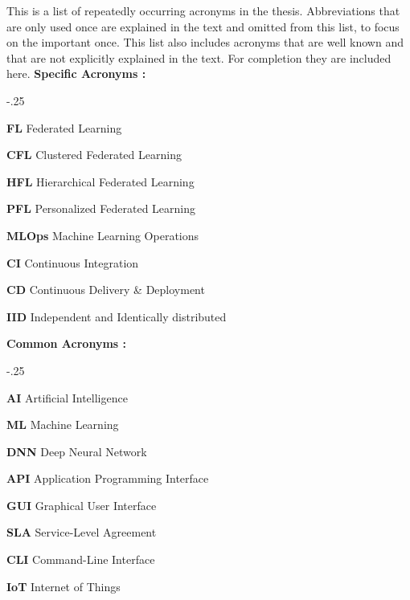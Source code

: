 This is a list of repeatedly occurring acronyms in the thesis.
Abbreviations that are only used once are explained in the text and omitted from this list,
to focus on the important once.
This list also includes acronyms that are well known and that are not explicitly explained in the text.
For completion they are included here.
\vspace{5mm}
\newline
\textbf{Specific Acronyms :}
\begin{acronym}
    \itemsep-.25\baselineskip
    \item[\textbf{FL}] Federated Learning 
    \item[\textbf{CFL}] Clustered Federated Learning 
    \item[\textbf{HFL}] Hierarchical Federated Learning 
    \item[\textbf{PFL}] Personalized Federated Learning 
    \item[\textbf{MLOps}] Machine Learning Operations
    \item[\textbf{CI}] Continuous Integration
    \item[\textbf{CD}] Continuous Delivery \& Deployment
    \item[\textbf{IID}] Independent and Identically distributed
\end{acronym}
\textbf{Common Acronyms :}
\begin{acronym}
    \itemsep-.25\baselineskip
    \item[\textbf{AI}] Artificial Intelligence
    \item[\textbf{ML}] Machine Learning
    \item[\textbf{DNN}] Deep Neural Network
    \item[\textbf{API}] Application Programming Interface
    \item[\textbf{GUI}] Graphical User Interface
    \item[\textbf{SLA}] Service-Level Agreement
    \item[\textbf{CLI}] Command-Line Interface
    \item[\textbf{IoT}] Internet of Things
\end{acronym}